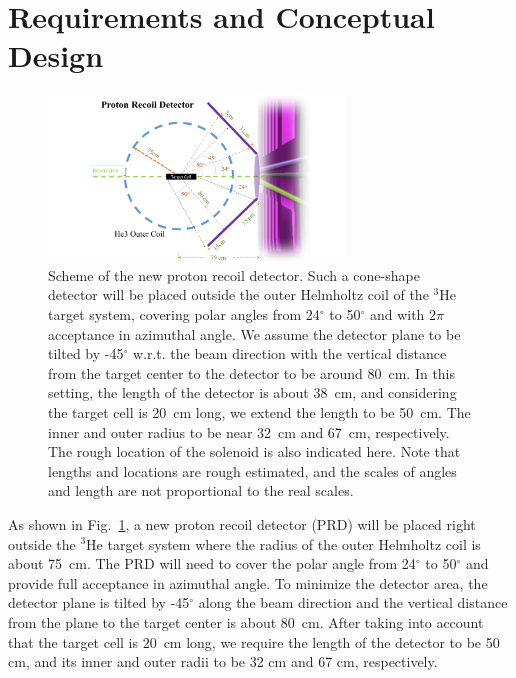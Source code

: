 \section{Requirements and Conceptual Design}

\begin{figure}[!ht]
 \begin{center}
  \includegraphics[width=0.7\textwidth]{./figures/prd_solid.pdf}
   \caption[Scheme of the new proton recoil detector ]{\footnotesize{Scheme of
       the new proton recoil detector. Such a cone-shape detector will be
       placed outside the outer Helmholtz coil of the $\mathrm{^{3}He}$ target
       system, covering polar angles from 24$^{\circ}$ to 50$^{\circ}$ and with
       2$\pi$ acceptance in azimuthal angle. We assume the detector plane
       to be tilted by -45$^{\circ}$ w.r.t. the beam direction with the
       vertical distance from the target center to the detector to be around
       80~cm. In this setting, the length of the detector is about 38~cm, and
       considering the target cell is 20~cm long, we extend the length to be
       50~cm. The inner and outer radius to be near 32~cm and 67~cm,
       respectively. The rough location of the solenoid is also indicated here. Note that lengths and locations are rough estimated, and the scales of angles and length are not proportional to the real scales.}}
   \label{prd_concept}
 \end{center}
\end{figure}
As shown in Fig.~\ref{prd_concept}, a new proton recoil detector (PRD) will be
placed right outside the $\mathrm{^{3}He}$ target system where the radius of
the outer Helmholtz coil is about 75~cm. The PRD will need to cover the polar
angle from 24$^{\circ}$ to 50$^{\circ}$ and provide full acceptance in
azimuthal angle. To minimize the detector area, the detector plane is tilted by
-45$^{\circ}$ along the beam direction and the vertical distance from the plane
to the target center is about 80~cm. After taking into account that the target
cell is 20~cm long, we require the length of the detector to be 50 cm, and its
inner and outer radii to be 32 cm and 67 cm, respectively.

